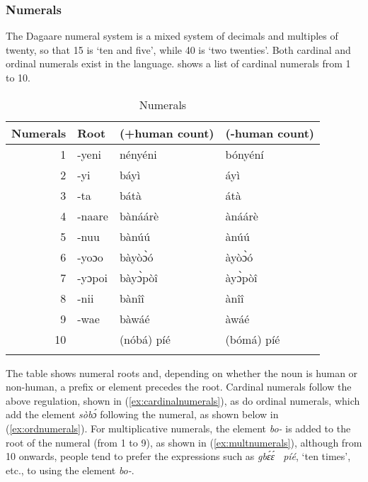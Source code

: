 \subsubsection{Numerals}
The Dagaare numeral system is a mixed system of decimals and multiples of twenty,
so that 15 is ‘ten and five’, while 40 is ‘two twenties’. Both cardinal and ordinal numerals exist
in the language.  shows a list of cardinal numerals from 1 to 10.
\begin{table}
    \begin{tabularx}{\textwidth}{rXXl}
    \lsptoprule
Numerals & Root &(+human count)& (-human count) \\\midrule
1 &-yeni&nényéni & bónyéní \\
2 &-yi&báyì&  áyì\\
3 &-ta&bátà& átà \\
4 & -naare&bànáárè& ànáárè\\
5 &-nuu&bànúú& ànúú\\
6 & -yoɔo&bàyòɔ̀ó& àyòɔ̀ó \\
7 & -yɔpoi&bàyɔ̀pòî& àyɔ̀pòî \\
8  &-nii&bànîî & ànîî \\
9  &-wae&bàwáé& àwáé \\
10 &&(nóbá) píé& (bómá) píé\\\lspbottomrule
\end{tabularx}
    \caption{Numerals}
    \label{tab:numerals}
\end{table}  



The table shows numeral roots and, depending on whether the noun is human or non-human, a
prefix or element precedes the root. Cardinal numerals follow the above regulation, shown in (\ref{ex:cardinalnumerals}), as do ordinal numerals, which add the element \textit{sòbɔ́}  following the numeral, as shown below in (\ref{ex:ordnumerals}). For multiplicative numerals, the element \textit{bo-} is added to the root of the numeral (from 1 to 9), as
shown in (\ref{ex:multnumerals}), although  from 10
onwards, people tend to prefer the expressions such as \textit{gbɛ́ɛ́~ píé}, ‘ten times’, etc., to using the element \textit{bo-}.

